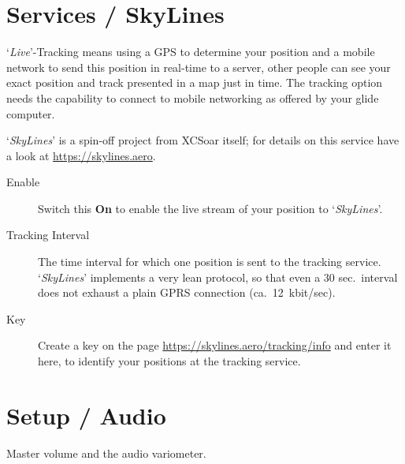 \section{Services / SkyLines}

`{\it Live}'-Tracking means using a GPS to determine your position and a mobile 
network to send this position in real-time to a server, other people can see 
your exact position and track presented in a map just in time.
The tracking option needs the capability to connect to mobile networking as offered by 
your glide computer.

`{\em SkyLines}' is a spin-off project from XCSoar itself; for details on this
service have a look at \url{https://skylines.aero}.

\begin{description}
\item[Enable]  Switch this {\bf On} to enable the live stream of 
  your position to `{\em SkyLines}'.
\item[Tracking Interval]  The time interval for which one position is sent to
  the tracking service. `{\em SkyLines}' implements a very lean protocol, so that even
  a 30 sec.\ interval does not exhaust a plain GPRS connection (ca.\ 12~kbit/sec).
\item[Key]  Create a key on the page \url{https://skylines.aero/tracking/info} 
  and enter it here, to identify your positions at the tracking service.
\end{description}


\section{Setup / Audio}\label{sec:audiovario-gauge}

Master volume and the audio variometer. \label{conf:audiovariogauge}

